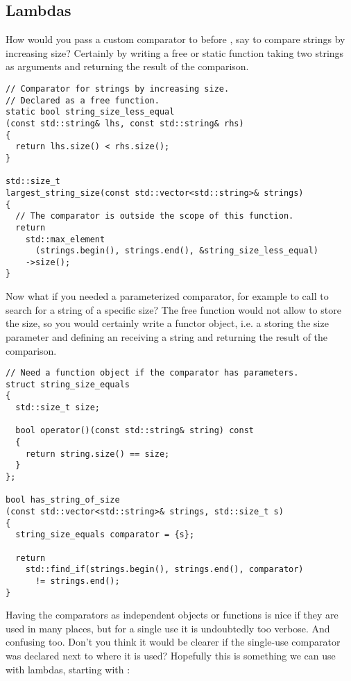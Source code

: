 \subsection{Lambdas}
\label{sec:lambda}

How would you pass a custom comparator to 
before , say to compare strings by increasing size? Certainly by
writing a free or static function taking two strings as arguments and
returning the result of the comparison.

\begin{lstlisting}
// Comparator for strings by increasing size.
// Declared as a free function.
static bool string_size_less_equal
(const std::string& lhs, const std::string& rhs)
{
  return lhs.size() < rhs.size();
}

std::size_t
largest_string_size(const std::vector<std::string>& strings)
{
  // The comparator is outside the scope of this function.
  return
    std::max_element
      (strings.begin(), strings.end(), &string_size_less_equal)
    ->size();
}
\end{lstlisting}

Now what if you needed a parameterized comparator, for example to call
 to search for a string of a specific size? The
free function would not allow to store the size, so you would
certainly write a functor object, i.e. a  storing the
size parameter and defining an  receiving a string
and returning the result of the comparison.

\begin{lstlisting}
// Need a function object if the comparator has parameters.
struct string_size_equals
{
  std::size_t size;

  bool operator()(const std::string& string) const
  {
    return string.size() == size;
  }
};

bool has_string_of_size
(const std::vector<std::string>& strings, std::size_t s)
{
  string_size_equals comparator = {s};

  return
    std::find_if(strings.begin(), strings.end(), comparator)
      != strings.end();
}
\end{lstlisting}

Having the comparators as independent objects or functions is nice if
they are used in many places, but for a single use it is undoubtedly
too verbose. And confusing too. Don't you think it would be clearer if
the single-use comparator was declared next to where it is used?
Hopefully this is something we can use with lambdas, starting with
:

